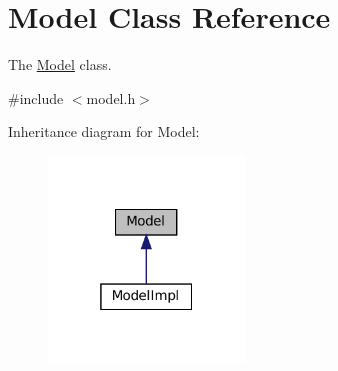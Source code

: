 \hypertarget{classModel}{}\section{Model Class Reference}
\label{classModel}


The \hyperlink{classModel}{Model} class.  




{\ttfamily \#include $<$model.\+h$>$}



Inheritance diagram for Model\+:\nopagebreak
\begin{figure}[H]
\begin{center}
\leavevmode
\includegraphics[width=148pt]{classModel__inherit__graph}
\end{center}
\end{figure}
